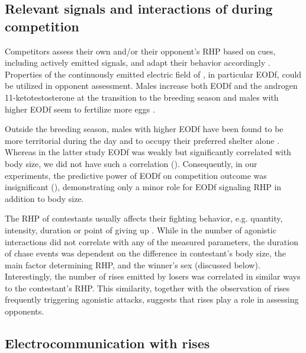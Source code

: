 \subsection{Relevant signals and interactions of \lepto{} during competition}
Competitors assess their own and/or their opponent's RHP based on cues, including actively emitted signals, and adapt their behavior accordingly \citep{Cluttonbrock1979, Enquist1990, Payne1998, ArnottElwood2009}. Properties of the continuously emitted electric field of \lepto{}, in particular EODf, could be utilized in opponent assessment. Males increase both EODf and the androgen 11-ketotestosterone at the transition to the breeding season \citep{Cuddy2012} and males with higher EODf seem to fertilize more eggs \citep{Hagedorn1985, Henninger2018}. 

Outside the breeding season, males with higher EODf have been found to be more territorial during the day \citep{Raab2019} and to occupy their preferred shelter alone \citep{Dunlap2002}. Whereas in the latter study EODf was weakly but significantly correlated with body size, we did not have such a correlation (). Consequently, in our experiments, the predictive power of EODf on competition outcome was insignificant (), demonstrating only a minor role for EODf signaling RHP in addition to body size.

The RHP of contestants usually affects their fighting behavior, e.g. quantity, intensity, duration or point of giving up \citep{ArnottElwood2009, Taylor2001, Briffa2004}. While in \lepto{} the number of agonistic interactions did not correlate with any of the measured parameters, the duration of chase events was dependent on the difference in contestant's body size, the main factor determining RHP, and the winner's sex (discussed below). Interestingly, the number of rises emitted by losers was correlated in similar ways to the contestant's RHP. This similarity, together with the observation of rises frequently triggering agonistic attacks, suggests that rises play a role in assessing opponents.

\subsection{Electrocommunication with rises}

